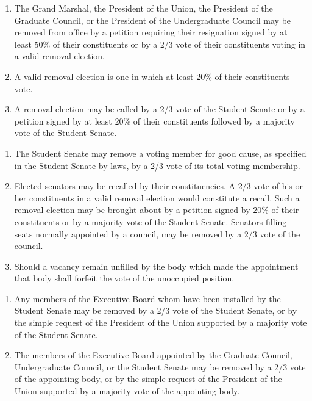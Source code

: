 

\begin{enumerate}
\item The Grand Marshal, the President of the Union, the President of the Graduate Council, or the President of the Undergraduate Council may be removed from office by a petition requiring their resignation signed by at least 50\% of their constituents or by a 2/3 vote of their constituents voting in a valid removal election.
\item A valid removal election is one in which at least 20\% of their constituents vote.
\item A removal election may be called by a 2/3 vote of the Student Senate or by a petition signed by at least 20\% of their constituents followed by a majority vote of the Student Senate.
\end{enumerate}


\begin{enumerate}
\item The Student Senate may remove a voting member for good cause, as specified in the Student Senate by-laws, by a 2/3 vote of its total voting membership.
\item Elected senators may be recalled by their constituencies. A 2/3 vote of his or her constituents in a valid removal election would constitute a recall. Such a removal election may be brought about by a petition signed by 20\% of their constituents or by a majority vote of the Student Senate. Senators filling seats normally appointed by a council, may be removed by a 2/3 vote of the council.
\item Should a vacancy remain unfilled by the body which made the appointment that body shall forfeit the vote of the unoccupied position.
\end{enumerate}


\begin{enumerate}
\item Any members of the Executive Board whom have been installed by the Student Senate may be removed by a 2/3 vote of the Student Senate, or by the simple request of the President of the Union supported by a majority vote of the Student Senate.
\item The members of the Executive Board appointed by the Graduate Council, Undergraduate Council, or the Student Senate may be removed by a 2/3 vote of the appointing body, or by the simple request of the President of the Union supported by a majority vote of the appointing body.
\end{enumerate}

